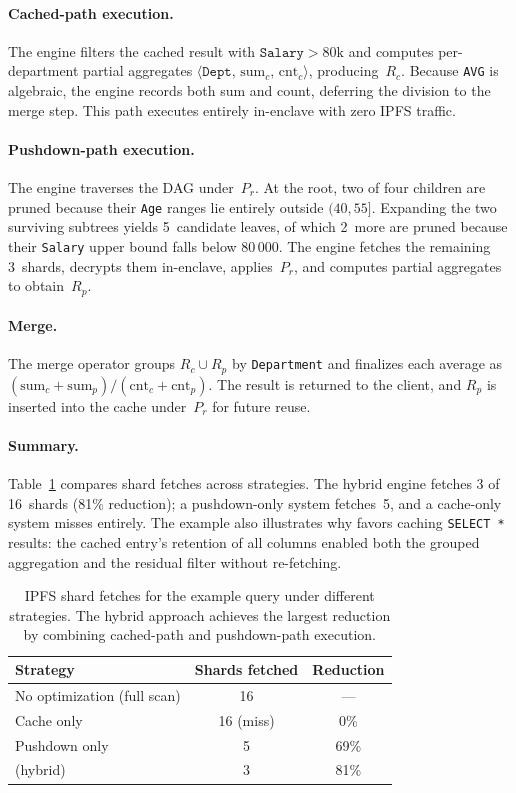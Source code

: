 \paragraph{Cached-path execution.}
The engine filters the cached result with
$\texttt{Salary} > 80\text{k}$ and computes per-department partial
aggregates $\langle \texttt{Dept},\, \text{sum}_c,\, \text{cnt}_c
\rangle$, producing~$R_c$.  Because \texttt{AVG} is algebraic, the
engine records both sum and count, deferring the division to the
merge step.  This path executes entirely in-enclave with zero IPFS
traffic.

\paragraph{Pushdown-path execution.}
The engine traverses the DAG under~$P_r$.  At the root, two of four
children are pruned because their \texttt{Age} ranges lie entirely
outside $(40, 55]$.  Expanding the two surviving subtrees yields
5~candidate leaves, of which 2~more are pruned because their
\texttt{Salary} upper bound falls below 80\,000.  The engine fetches
the remaining 3~shards, decrypts them in-enclave, applies~$P_r$, and
computes partial aggregates to obtain~$R_p$.

\paragraph{Merge.}
The merge operator groups $R_c \cup R_p$ by \texttt{Department} and
finalizes each average as
$(\text{sum}_c + \text{sum}_p) / (\text{cnt}_c + \text{cnt}_p)$.
The result is returned to the client, and $R_p$ is inserted into the
cache under~$P_r$ for future reuse.

\paragraph{Summary.}
Table~\ref{tab:hybrid_benefit} compares shard fetches across
strategies.  The hybrid engine fetches 3 of 16~shards (81\%
reduction); a pushdown-only system fetches~5, and a cache-only system
misses entirely.  The example also illustrates why \ours{} favors
caching \texttt{SELECT *} results: the cached entry's retention of
all columns enabled both the grouped aggregation and the residual
filter without re-fetching.

\begin{table}[t]
\centering
\small
\begin{tabular}{lcc}
\hline
\textbf{Strategy} & \textbf{Shards fetched} & \textbf{Reduction} \\
\hline
No optimization (full scan) & 16 & --- \\
Cache only                  & 16 (miss) & 0\% \\
Pushdown only               &  5 & 69\% \\
\ours{} (hybrid)            &  3 & 81\% \\
\hline
\end{tabular}
\caption{IPFS shard fetches for the example query under different
strategies.  The hybrid approach achieves the largest reduction by
combining cached-path and pushdown-path execution.}
\label{tab:hybrid_benefit}
\end{table}


